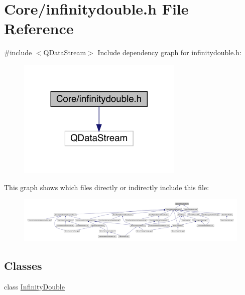 \hypertarget{a00059}{}\section{Core/infinitydouble.h File Reference}
\label{a00059}
{\ttfamily \#include $<$Q\+Data\+Stream$>$}\newline
Include dependency graph for infinitydouble.\+h\+:
\nopagebreak
\begin{figure}[H]
\begin{center}
\leavevmode
\includegraphics[width=224pt]{d9/d73/a00060}
\end{center}
\end{figure}
This graph shows which files directly or indirectly include this file\+:
\nopagebreak
\begin{figure}[H]
\begin{center}
\leavevmode
\includegraphics[width=350pt]{d4/de8/a00061}
\end{center}
\end{figure}
\subsection*{Classes}
\begin{DoxyCompactItemize}
\item 
class \hyperlink{a00161}{Infinity\+Double}
\end{DoxyCompactItemize}

